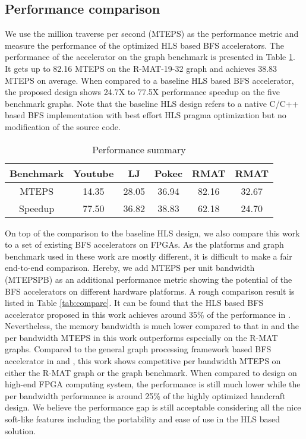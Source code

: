 \subsection{Performance comparison}
We use the million traverse per second (MTEPS) as 
the performance metric and measure the performance 
of the optimized HLS based BFS accelerators. 
The performance of the accelerator on the graph benchmark is 
presented in Table \ref{tab:performance-summary}. 
It gets up to 82.16 MTEPS on the R-MAT-19-32 graph and achieves 
38.83 MTEPS on average. When compared to a baseline HLS based 
BFS accelerator, the proposed design shows 24.7X to 77.5X performance 
speedup on the five benchmark graphs. Note that the baseline HLS design 
refers to a native C/C++ based BFS implementation 
with best effort HLS pragma optimization but no modification of the source code.

\begin{table}
    \centering
  \caption{Performance summary}
  \label{tab:performance-summary}
  \begin{tabular}{cccccc}
    \toprule
      Benchmark & Youtube & LJ & Pokec & RMAT\uppercase\expandafter{\romannumeral1} & RMAT\uppercase\expandafter{\romannumeral2} \\
    \midrule
      MTEPS & 14.35 & 28.05 & 36.94 & 82.16 & 32.67 \\
      Speedup & 77.50 & 36.82 & 38.83 & 62.18 & 24.70 \\
  \bottomrule
\end{tabular}
\end{table}

On top of the comparison to the baseline HLS design, we also compare 
this work to a set of existing BFS accelerators on FPGAs. As the platforms 
and graph benchmark used in these work are mostly different, it is 
difficult to make a fair end-to-end comparison. Hereby, we add
MTEPS per unit bandwidth (MTEPSPB) as an additional performance metric showing the 
potential of the BFS accelerators on different hardware platforms. 
A rough comparison result is listed in Table \ref{tab:compare}. It can be found that the HLS 
based BFS accelerator proposed in this work achieves around 35\% of the 
performance in \cite{zhang2017boosting}. Nevertheless, the memory bandwidth 
is much lower compared to that in \cite{zhang2017boosting} and the per bandwidth 
MTEPS in this work outperforms especially on the R-MAT graphs. Compared to the 
general graph processing framework based BFS accelerator in \cite{dai2016fpgp} and 
\cite{nurvitadhi2014graphgen}, this work shows competitive per bandwidth MTEPS on either 
the R-MAT graph or the graph benchmark. When compared to design on high-end 
FPGA computing system, the performance is still much lower while the per bandwidth 
performance is around 25\% of the highly optimized handcraft design. We believe the 
performance gap is still acceptable considering all the nice soft-like features including 
the portability and ease of use in the HLS based solution.

